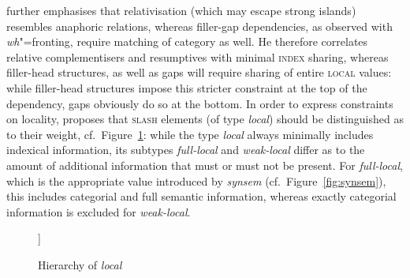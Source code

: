\documentclass[output=paper
,notxmath 
 	        ,biblatex
                ,babelshorthands
                ,newtxmath
                ,draftmode
                ,colorlinks, citecolor=brown
]{langscibook}
\begin{document}
\noindent
\citet{Crysmann2012b-u} further emphasises that relativisation (which
may escape strong islands) resembles anaphoric relations, whereas
filler-gap dependencies, as observed with \emph{wh}"=fronting, require
matching of category as well. He therefore correlates relative
complementisers and resumptives with minimal \textsc{index} sharing,
whereas filler-head structures, as well as gaps will require sharing
of entire \textsc{local} values: while filler-head structures impose
this stricter constraint at the top of the dependency, gaps obviously
do so at the bottom. In order to express constraints on locality,
\citet{Crysmann:12,Crysmann:16} proposes that \textsc{slash} elements
(of type \textit{local}) should be distinguished as to their weight,
cf.~Figure~\ref{fig:local}: while the type \textit{local} always
minimally includes indexical information, its subtypes
\textit{full-local} and \textit{weak-local} differ as to the amount of
additional information that must or must not be present. For
\textit{full-local}, which is the appropriate value introduced by
\textit{synsem} (cf.~Figure~\ref{fig:synsem}), this includes
categorial and full semantic information, whereas exactly categorial
information is excluded for \textit{weak-local}.



%  
%
%
%
%



\begin{figure}
	\centering

\begin{forest}
[%
\avm{
	[\type*{local} 
	cont &	[index & ind ] ]
}%
	[%
	\avm{
		[\type*{full-local}
		cat & cat ]
	}]
	[%
	\avm{
		[\type*{weak-local}
		cont &	[rels <  > ] ]
	}]
]
\end{forest}  
  
\caption{\label{fig:local}Hierarchy of \textit{local} \citep[]{Crysmann:16}}
  
\end{figure}
\end{document}
